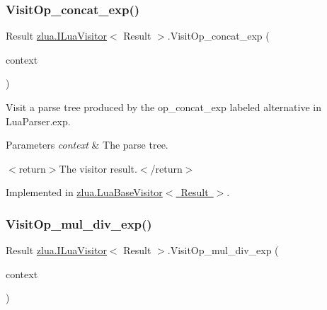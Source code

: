 \subsubsection{\texorpdfstring{Visit\+Op\+\_\+concat\+\_\+exp()}{VisitOp\_concat\_exp()}}
{\footnotesize\ttfamily Result \mbox{\hyperlink{interfacezlua_1_1_i_lua_visitor}{zlua.\+I\+Lua\+Visitor}}$<$ Result $>$.Visit\+Op\+\_\+concat\+\_\+exp (\begin{DoxyParamCaption}\item[{\mbox{[}\+Not\+Null\mbox{]} \mbox{\hyperlink{classzlua_1_1_lua_parser_1_1_op__concat__exp_context}{Lua\+Parser.\+Op\+\_\+concat\+\_\+exp\+Context}}}]{context }\end{DoxyParamCaption})}



Visit a parse tree produced by the {\ttfamily op\+\_\+concat\+\_\+exp} labeled alternative in Lua\+Parser.\+exp. 


\begin{DoxyParams}{Parameters}
{\em context} & The parse tree.\\
\hline
\end{DoxyParams}
$<$return$>$The visitor result.$<$/return$>$ 

Implemented in \mbox{\hyperlink{classzlua_1_1_lua_base_visitor_a122ef407ec779e8922c617dc3a095356}{zlua.\+Lua\+Base\+Visitor$<$ Result $>$}}.

\mbox{\label{interfacezlua_1_1_i_lua_visitor_acfc0ee7f37ae465d9690dcba6fac5a60}} 
\subsubsection{\texorpdfstring{Visit\+Op\+\_\+mul\+\_\+div\+\_\+exp()}{VisitOp\_mul\_div\_exp()}}
{\footnotesize\ttfamily Result \mbox{\hyperlink{interfacezlua_1_1_i_lua_visitor}{zlua.\+I\+Lua\+Visitor}}$<$ Result $>$.Visit\+Op\+\_\+mul\+\_\+div\+\_\+exp (\begin{DoxyParamCaption}\item[{\mbox{[}\+Not\+Null\mbox{]} \mbox{\hyperlink{classzlua_1_1_lua_parser_1_1_op__mul__div__exp_context}{Lua\+Parser.\+Op\+\_\+mul\+\_\+div\+\_\+exp\+Context}}}]{context }\end{DoxyParamCaption})}



